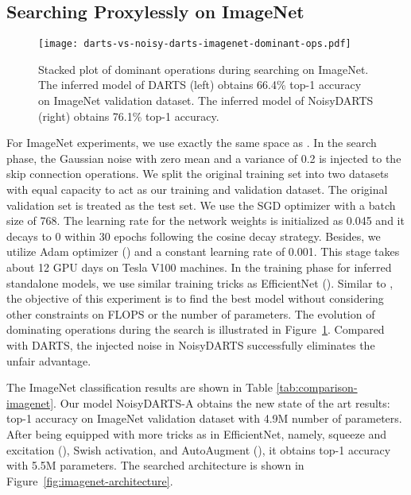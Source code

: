 \documentclass{article}
\newcommand{\citec}[1]{(\cite{#1})}
\begin{document}
\subsection{Searching Proxylessly on ImageNet}

\begin{figure}[ht]
	\centering		\texttt{[image: darts-vs-noisy-darts-imagenet-dominant-ops.pdf]}
	\caption{Stacked plot of dominant operations during searching on ImageNet. The inferred model of DARTS (left) obtains 66.4\% top-1 accuracy on ImageNet validation dataset. The inferred model of NoisyDARTS (right) obtains 76.1\% top-1 accuracy. }
	\label{fig:stacked-plot-dominant-imagent}
\end{figure}

For ImageNet experiments, we use exactly the same space as \cite{cai2018proxylessnas,chu2019scarletnas}.
In the search phase, the Gaussian noise with zero mean and a variance of 0.2 is injected to the skip connection operations. We split the original training set into two datasets with equal capacity to act as our training and validation dataset. The original validation set is treated as the test set. We use the SGD optimizer with a batch size of 768. The learning rate for the network weights is initialized as 0.045 and it decays to 0 within 30 epochs following the cosine decay strategy.  Besides, we utilize Adam optimizer () and a constant learning rate of 0.001. This stage takes about 12 GPU days on Tesla V100 machines. In the training phase for inferred standalone models, we use similar training tricks as EfficientNet \citec{tan2019efficientnet}. Similar to \cite{liu2018darts,liu2018progressive}, the objective of this experiment is to find the best model without considering other constraints on FLOPS or the number of parameters.  The evolution of dominating operations during the search is illustrated in Figure~\ref{fig:stacked-plot-dominant-imagent}. Compared with DARTS,  the injected noise in NoisyDARTS successfully eliminates the unfair advantage.


The ImageNet classification results are shown in Table \ref{tab:comparison-imagenet}. Our model NoisyDARTS-A obtains the new state of the art results:  top-1 accuracy on ImageNet validation dataset with 4.9M number of parameters. After being equipped with more tricks as in EfficientNet, namely, squeeze and excitation \citec{hu2018squeeze}, Swish activation, and AutoAugment \citec{cubuk2018autoaugment}, it obtains   top-1 accuracy  with 5.5M parameters. The searched architecture is shown in Figure~\ref{fig:imagenet-architecture}.
\end{document}
